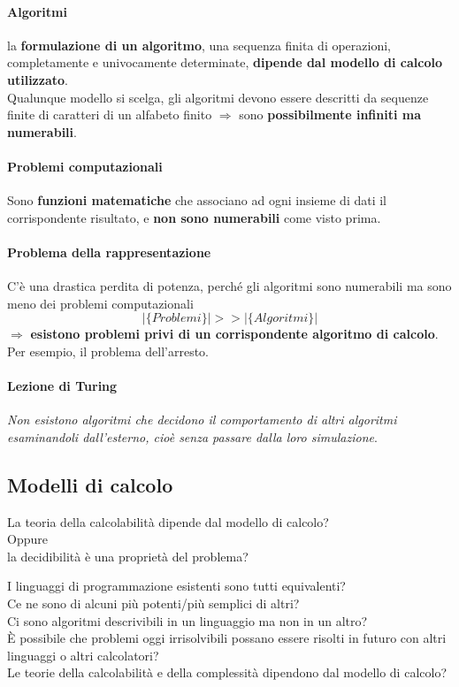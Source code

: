 \documentclass[10pt]{book}
\begin{document}
\paragraph{Algoritmi} la \textbf{formulazione di un algoritmo}, una sequenza finita di operazioni, completamente e univocamente determinate, \textbf{dipende dal modello di calcolo utilizzato}.\\
Qualunque modello si scelga, gli algoritmi devono essere descritti da sequenze finite di caratteri di un alfabeto finito $\Rightarrow$ sono \textbf{possibilmente infiniti ma numerabili}.
\paragraph{Problemi computazionali} Sono \textbf{funzioni matematiche} che associano ad ogni insieme di dati il corrispondente risultato, e \textbf{non sono numerabili} come visto prima.
\paragraph{Problema della rappresentazione} C'è una drastica perdita di potenza, perché gli algoritmi sono numerabili ma sono meno dei problemi computazionali $$|\{Problemi\}| >> |\{Algoritmi\}|$$
$\Rightarrow$ \textbf{esistono problemi privi di un corrispondente algoritmo di calcolo}. Per esempio, il problema dell'arresto.
\paragraph{Lezione di Turing} \textit{Non esistono algoritmi che decidono il comportamento di altri algoritmi esaminandoli dall'esterno, cioè senza passare dalla loro simulazione}.
\subsection{Modelli di calcolo}\begin{center}
La teoria della calcolabilità dipende dal modello di calcolo?\\
Oppure\\
la decidibilità è una proprietà del problema?
\end{center}
\pagebreak
I linguaggi di programmazione esistenti sono tutti equivalenti?\\
Ce ne sono di alcuni più potenti/più semplici di altri?\\
Ci sono algoritmi descrivibili in un linguaggio ma non in un altro?\\
È possibile che problemi oggi irrisolvibili possano essere risolti in futuro con altri linguaggi o altri calcolatori?\\
Le teorie della calcolabilità e della complessità dipendono dal modello di calcolo?
\end{document}
